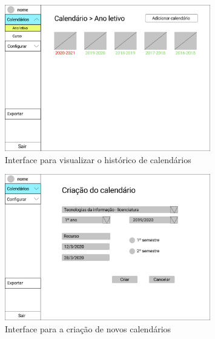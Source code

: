 \documentclass[11pt, twoside]{report}
\begin{document}
\begin{figure}[H] 
	\centering 
	\includegraphics[width=0.8\textwidth,height=0.8\textheight,keepaspectratio]{image/prototipowireframes/pesquisacalendarioanoletivo}
	\caption{Interface para visualizar o histórico de calendários}
	\label{interfacevercalendario}
\end{figure}

\begin{figure}[H] 
	\centering 
	\includegraphics[width=0.8\textwidth,height=0.8\textheight,keepaspectratio]{image/prototipowireframes/criarcalendario}
	\caption{Interface para a criação de novos calendários}
	\label{interfacecriarcalendario}
\end{figure}
	
\end{document}
